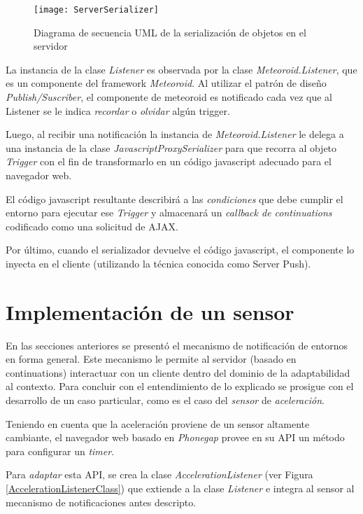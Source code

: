 \begin{figure}[ht!]
\centering
\texttt{[image: ServerSerializer]}
\caption{Diagrama de secuencia UML de la serialización de objetos en el servidor}
\label{ServerSerializer}
\end{figure}

La instancia de la clase \emph{Listener} es observada por la clase \emph{Meteoroid.Listener}, que es un componente del framework \emph{Meteoroid}. Al utilizar el patrón de diseño \emph{Publish/Suscriber}, el componente de meteoroid es notificado cada vez que al Listener se le indica \emph{recordar} o \emph{olvidar} algún trigger.

Luego, al recibir una notificación la instancia de \emph{Meteoroid.Listener} le delega a una instancia de la clase \emph{JavascriptProxySerializer} para que recorra al objeto \emph{Trigger} con el fin de transformarlo en un código javascript adecuado para el navegador web.

El código javascript resultante describirá a las \emph{condiciones} que debe cumplir el entorno para ejecutar ese \emph{Trigger} y almacenará un \emph{callback de continuations} codificado como una solicitud de AJAX.

Por último, cuando el serializador devuelve el código javascript, el componente lo inyecta en el cliente (utilizando la técnica conocida como Server Push).


\section{Implementación de un sensor}

En las secciones anteriores se presentó el mecanismo de notificación de entornos en forma general. Este mecanismo le permite al servidor (basado en continuations) interactuar con un cliente dentro del dominio de la adaptabilidad al contexto. Para concluir con el entendimiento de lo explicado se prosigue con el desarrollo de un caso particular, como es el caso del \emph{sensor} de \emph{aceleración}.

Teniendo en cuenta que la aceleración proviene de un sensor altamente cambiante, el navegador web basado en \emph{Phonegap} provee en su API un método para configurar un \emph{timer}.

Para \emph{adaptar} esta API, se crea la clase \emph{AccelerationListener} (ver Figura \ref{AccelerationListenerClass}) que extiende a la clase \emph{Listener} e integra al sensor al mecanismo de notificaciones antes descripto.

